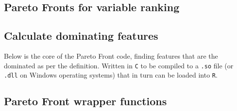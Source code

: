 \documentclass[12pt,a4paper,oneside]{report}
\begin{document}
\begin{appendix}
	

\clearpage



\section{Pareto Fronts for variable ranking} 



\clearpage

\subsection{Calculate dominating features} 

Below is the core of the Pareto Front code, finding features that are the dominated as per the definition. Written in {\tt C} to be compiled to a {\tt .so} file (or \texttt{.dll} on Windows operating systems) that in turn can be loaded into {\tt R}.

	

\clearpage

\subsection{Pareto Front wrapper functions} 

	


\end{appendix}
\end{document}
